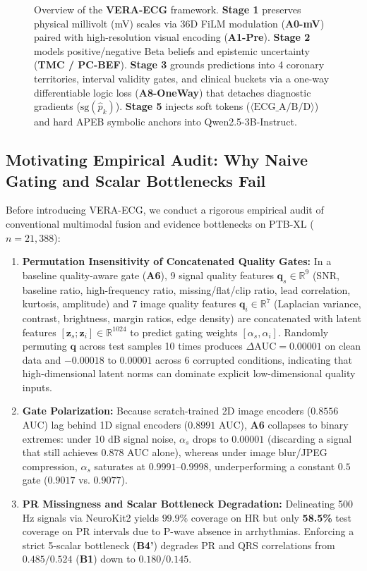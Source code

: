 \documentclass[preprint,12pt]{elsarticle}
\begin{document}
\begin{figure}[htbp]
{\begin{tikzpicture}
\end{tikzpicture}%
}
\caption{Overview of the \textbf{VERA-ECG} framework. \textbf{Stage 1} preserves physical millivolt (mV) scales via 36D FiLM modulation (\textbf{A0-mV}) paired with high-resolution visual encoding (\textbf{A1-Pre}). \textbf{Stage 2} models positive/negative Beta beliefs and epistemic uncertainty (\textbf{TMC / PC-BEF}). \textbf{Stage 3} grounds predictions into 4 coronary territories, interval validity gates, and clinical buckets via a one-way differentiable logic loss (\textbf{A8-OneWay}) that detaches diagnostic gradients ($\text{sg}(\hat{p}_k)$). \textbf{Stage 5} injects soft tokens ($\langle\text{ECG\_A/B/D}\rangle$) and hard APEB symbolic anchors into Qwen2.5-3B-Instruct.}
\label{fig:architecture}
\end{figure}

\subsection{Motivating Empirical Audit: Why Naive Gating and Scalar Bottlenecks Fail}
Before introducing VERA-ECG, we conduct a rigorous empirical audit of conventional multimodal fusion and evidence bottlenecks on PTB-XL ($n=21,388$):
\begin{enumerate}
    \item \textbf{Permutation Insensitivity of Concatenated Quality Gates:} In a baseline quality-aware gate (\textbf{A6}), 9 signal quality features $\bm{q}_s \in \mathbb{R}^9$ (SNR, baseline ratio, high-frequency ratio, missing/flat/clip ratio, lead correlation, kurtosis, amplitude) and 7 image quality features $\bm{q}_i \in \mathbb{R}^7$ (Laplacian variance, contrast, brightness, margin ratios, edge density) are concatenated with latent features $[\bm{z}_s; \bm{z}_i] \in \mathbb{R}^{1024}$ to predict gating weights $[\alpha_s, \alpha_i]$. Randomly permuting $\bm{q}$ across test samples 10 times produces $\Delta\text{AUC} = 0.00001$ on clean data and $-0.00018\text{ to }0.00001$ across 6 corrupted conditions, indicating that high-dimensional latent norms can dominate explicit low-dimensional quality inputs.
    \item \textbf{Gate Polarization:} Because scratch-trained 2D image encoders ($0.8556$ AUC) lag behind 1D signal encoders ($0.8991$ AUC), \textbf{A6} collapses to binary extremes: under 10 dB signal noise, $\alpha_s$ drops to $0.00001$ (discarding a signal that still achieves $0.878$ AUC alone), whereas under image blur/JPEG compression, $\alpha_s$ saturates at $0.9991\text{--}0.9998$, underperforming a constant $0.5$ gate ($0.9017$ vs. $0.9077$).
    \item \textbf{PR Missingness and Scalar Bottleneck Degradation:} Delineating 500 Hz signals via NeuroKit2 yields $99.9\%$ coverage on HR but only \textbf{58.5\%} test coverage on PR intervals due to P-wave absence in arrhythmias. Enforcing a strict 5-scalar bottleneck (\textbf{B4'}) degrades PR and QRS correlations from $0.485/0.524$ (\textbf{B1}) down to $0.180/0.145$.
\end{enumerate}
\end{document}
